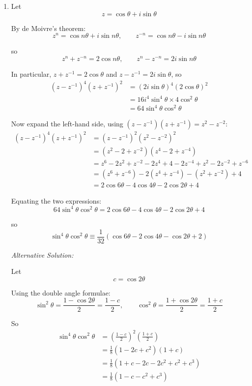 \documentclass[leqno]{article}
\begin{document}
\begin{enumerate}[
  label=\textbf{\arabic*.},
  leftmargin=*,
  topsep=0pt,
  partopsep=0pt,
  parsep=0pt
]
\vspace*{10pt}

\begin{djsSolution}
\begin{enumerate}[label=\textbf{(\alph*)}]
\item Let
\[
z=\cos\theta+i\sin\theta
\]

By de Moivre's theorem:
\[
z^n=\cos n\theta+i\sin n\theta,
\qquad
z^{-n}=\cos n\theta-i\sin n\theta
\]

so
\[
z^n+z^{-n}=2\cos n\theta,
\qquad
z^n-z^{-n}=2i\sin n\theta
\]

In particular, \(z+z^{-1}=2\cos\theta\) and \(z-z^{-1}=2i\sin\theta\), so
\begin{align*}
(z-z^{-1})^4(z+z^{-1})^2
&=(2i\sin\theta)^4(2\cos\theta)^2 \\
&=16i^4\sin^4\theta\times 4\cos^2\theta \\
&=64\sin^4\theta\cos^2\theta
\end{align*}

Now expand the left-hand side, using \((z-z^{-1})(z+z^{-1})=z^2-z^{-2}\):
\begin{align*}
(z-z^{-1})^4(z+z^{-1})^2
&=(z-z^{-1})^2(z^2-z^{-2})^2 \\
&=(z^2-2+z^{-2})(z^4-2+z^{-4}) \\
&=z^6-2z^2+z^{-2}-2z^4+4-2z^{-4}+z^2-2z^{-2}+z^{-6} \\
&=(z^6+z^{-6})-2(z^4+z^{-4})-(z^2+z^{-2})+4 \\
&=2\cos 6\theta-4\cos 4\theta-2\cos 2\theta+4
\end{align*}

Equating the two expressions:
\[
64\sin^4\theta\cos^2\theta=2\cos 6\theta-4\cos 4\theta-2\cos 2\theta+4
\]

so
\[
\sin^4\theta\cos^2\theta\equiv \frac{1}{32}\left(\cos 6\theta-2\cos 4\theta-\cos 2\theta+2\right)
\]

\medskip

\textit{Alternative Solution:}

Let
\[
c=\cos 2\theta
\]

Using the double angle formulae:
\[
\sin^2\theta=\frac{1-\cos 2\theta}{2}=\frac{1-c}{2},
\qquad
\cos^2\theta=\frac{1+\cos 2\theta}{2}=\frac{1+c}{2}
\]

So
\begin{align*}
\sin^4\theta\cos^2\theta
&=\left(\frac{1-c}{2}\right)^2\left(\frac{1+c}{2}\right) \\
&=\frac18(1-2c+c^2)(1+c) \\
&=\frac18(1+c-2c-2c^2+c^2+c^3) \\
&=\frac18(1-c-c^2+c^3)
\end{align*}


\end{enumerate}
\end{djsSolution}
\end{enumerate}
\end{document}
